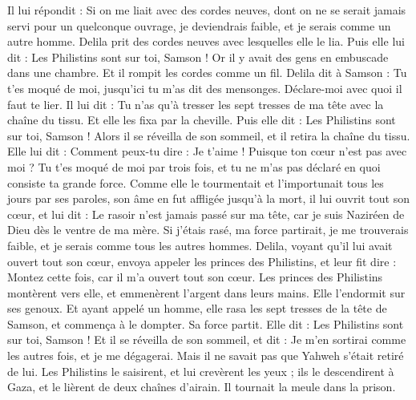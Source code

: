 \begin{multicols}{2}
Il lui répondit : Si on me liait avec des cordes neuves, dont on ne se serait jamais servi pour un quelconque ouvrage, je deviendrais faible, et je serais comme un autre homme.
Delila prit des cordes neuves avec lesquelles elle le lia. Puis elle lui dit : Les Philistins sont sur toi, Samson ! Or il y avait des gens en embuscade dans une chambre. Et il rompit les cordes comme un fil.
Delila dit à Samson : Tu t'es moqué de moi, jusqu'ici tu m'as dit des mensonges. Déclare-moi avec quoi il faut te lier. Il lui dit : Tu n'as qu'à tresser les sept tresses de ma tête avec la chaîne du tissu.
Et elle les fixa par la cheville. Puis elle dit : Les Philistins sont sur toi, Samson ! Alors il se réveilla de son sommeil, et il retira la chaîne du tissu.
Elle lui dit : Comment peux-tu dire : Je t'aime ! Puisque ton cœur n'est pas avec moi ? Tu t'es moqué de moi par trois fois, et tu ne m'as pas déclaré en quoi consiste ta grande force.
Comme elle le tourmentait et l'importunait tous les jours par ses paroles, son âme en fut affligée jusqu'à la mort,
il lui ouvrit tout son cœur, et lui dit : Le rasoir n'est jamais passé sur ma tête, car je suis Naziréen de Dieu dès le ventre de ma mère. Si j'étais rasé, ma force partirait, je me trouverais faible, et je serais comme tous les autres hommes.
Delila, voyant qu'il lui avait ouvert tout son cœur, envoya appeler les princes des Philistins, et leur fit dire : Montez cette fois, car il m'a ouvert tout son cœur. Les princes des Philistins montèrent vers elle, et emmenèrent l'argent dans leurs mains.
Elle l'endormit sur ses genoux. Et ayant appelé un homme, elle rasa les sept tresses de la tête de Samson, et commença à le dompter. Sa force partit.
Elle dit : Les Philistins sont sur toi, Samson ! Et il se réveilla de son sommeil, et dit : Je m'en sortirai comme les autres fois, et je me dégagerai. Mais il ne savait pas que Yahweh s'était retiré de lui.
Les Philistins le saisirent, et lui crevèrent les yeux ; ils le descendirent à Gaza, et le lièrent de deux chaînes d'airain. Il tournait la meule dans la prison.

\end{multicols}

